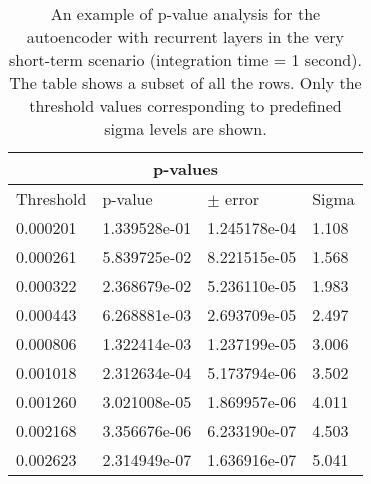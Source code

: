 \begin{table}[!h]
\centering
\begin{tabular}{|p{3cm}|p{3cm}|p{3cm}|p{3cm}|}
\hline
\multicolumn{4}{|c|}{p-values} \\
\hline
Threshold & p-value & $\pm$ error &  Sigma \\
\hline
  0.000201 & 1.339528e-01 & 1.245178e-04 &  1.108 \\
  0.000261 & 5.839725e-02 & 8.221515e-05 &  1.568 \\
  0.000322 & 2.368679e-02 & 5.236110e-05 &  1.983 \\
  0.000443 & 6.268881e-03 & 2.693709e-05 &  2.497 \\
  0.000806 & 1.322414e-03 & 1.237199e-05 &  3.006 \\
  0.001018 & 2.312634e-04 & 5.173794e-06 &  3.502 \\
  0.001260 & 3.021008e-05 & 1.869957e-06 &  4.011 \\
  0.002168 & 3.356676e-06 & 6.233190e-07 &  4.503 \\
  0.002623 & 2.314949e-07 & 1.636916e-07 &  5.041 \\
\hline
\end{tabular}
\caption{An example of p-value analysis for the autoencoder with recurrent layers in the very short-term scenario (integration time = 1 second). The table shows a subset of all the rows. Only the threshold values corresponding to predefined sigma levels are shown.}
\label{tab:p-value-table-rnn-itime-1-appendix}
\end{table}

\FloatBarrier
\section{}